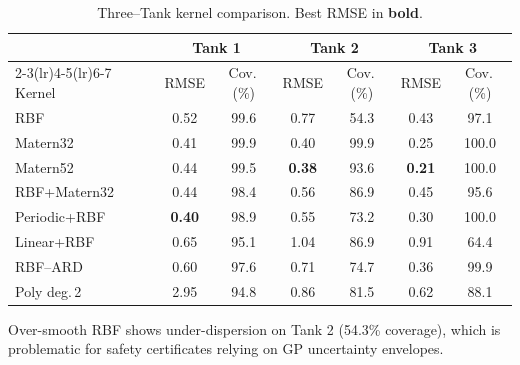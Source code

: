 \documentclass[10pt]{article}
\newcommand{\1}{\mathbbm{1}}
\begin{document}
\begin{table}[ht]
\centering
\caption{Three–Tank kernel comparison. Best RMSE in \textbf{bold}.}
\label{tab:wt-random-full}
\setlength{\tabcolsep}{2pt}
\small
\begin{tabular}{lcccccc}
\toprule
& \multicolumn{2}{c}{\textbf{Tank 1}} & \multicolumn{2}{c}{\textbf{Tank 2}} & \multicolumn{2}{c}{\textbf{Tank 3}} \\
\cmidrule(lr){2-3}\cmidrule(lr){4-5}\cmidrule(lr){6-7}
Kernel & RMSE & Cov.\,(\%) & RMSE & Cov.\,(\%) & RMSE & Cov.\,(\%) \\
\midrule
RBF           & 0.52 & 99.6 & 0.77 & 54.3 & 0.43 & 97.1 \\
Matern32      & 0.41 & 99.9 & 0.40 & 99.9 & 0.25 & 100.0 \\
Matern52      & 0.44 & 99.5 & \bfseries 0.38 & 93.6 & \bfseries 0.21 & 100.0 \\
RBF+Matern32  & 0.44 & 98.4 & 0.56 & 86.9 & 0.45 & 95.6 \\
Periodic+RBF  & \bfseries 0.40 & 98.9 & 0.55 & 73.2 & 0.30 & 100.0 \\
Linear+RBF    & 0.65 & 95.1 & 1.04 & 86.9 & 0.91 & 64.4 \\
RBF–ARD       & 0.60 & 97.6 & 0.71 & 74.7 & 0.36 & 99.9 \\
Poly deg.\,2  & 2.95 & 94.8 & 0.86 & 81.5 & 0.62 & 88.1 \\
\bottomrule
\end{tabular}
\end{table}

Over-smooth RBF shows under-dispersion on Tank 2 (54.3\% coverage), which is problematic for safety certificates relying on GP uncertainty envelopes.
\end{document}
